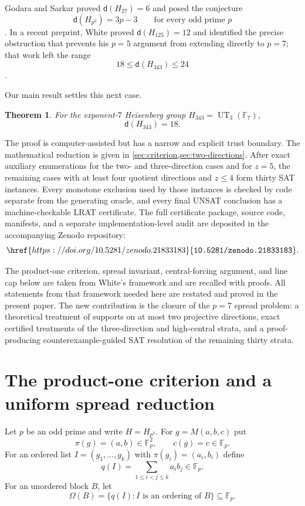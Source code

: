 \documentclass[11pt]{amsart}
\newtheorem{theorem}{Theorem}[section]
\theoremstyle{definition}
\newcommand{\F}{\mathbb F}
\newcommand{\HH}{H_{343}}
\newcommand{\dd}{\mathsf d}
\newcommand{\Om}{\Omega}
\begin{document}
Godara and Sarkar proved $\dd(H_{27})=6$ and posed the conjecture
\[
\dd(H_{p^3})=3p-3
\qquad\text{for every odd prime }p
\]
\cite{GodaraSarkar2025}. In a recent preprint, White proved
$\dd(H_{125})=12$ and identified the precise obstruction that prevents
his $p=5$ argument from extending directly to $p=7$; that work left the
range
\[
18\leq \dd(H_{343})\leq 24
\]
\cite{White2026}.

Our main result settles this next case.

\begin{theorem}\label{thm:main}
For the exponent-$7$ Heisenberg group $\HH=\operatorname{UT}_3(\F_7)$,
\[
\dd(\HH)=18.
\]
\end{theorem}

The proof is computer-assisted but has a narrow and explicit trust boundary. The mathematical reduction is given in \cref{sec:criterion,sec:two-directions}. After exact auxiliary enumerations for the two- and three-direction cases and for $z=5$, the remaining cases with at least four quotient directions and $z\leq4$ form thirty SAT instances. Every monotone exclusion used by those instances is checked by code separate from the generating oracle, and every final UNSAT conclusion has a machine-checkable LRAT certificate. The full certificate package, source code, manifests, and a separate implementation-level audit are deposited in the accompanying Zenodo repository:
\[
\href{https://doi.org/10.5281/zenodo.21833183}{\texttt{10.5281/zenodo.21833183}}.
\]

The product-one criterion, spread invariant, central-forcing argument,
and line cap below are taken from White's framework \cite{White2026}
and are recalled with proofs.  All statements from that framework
needed here are restated and proved in the present paper.  The new
contribution is the closure of the $p=7$ spread problem: a theoretical
treatment of supports on at most two projective directions, exact
certified treatments of the three-direction and high-central strata,
and a proof-producing counterexample-guided SAT resolution of the
remaining thirty strata.

\section{The product-one criterion and a uniform spread reduction}\label{sec:criterion}

Let $p$ be an odd prime and write $H=H_{p^3}$.  For
$g=M(a,b,c)$ put
\[
\pi(g)=(a,b)\in\F_p^2,\qquad c(g)=c\in\F_p.
\]
For an ordered list $I=(g_1,\ldots,g_k)$ with
$\pi(g_i)=(a_i,b_i)$ define
\[
q(I)=\sum_{1\leq i<j\leq k} a_i b_j\in\F_p.
\]
For an unordered block $B$, let
\[
\Om(B)=\{q(I): I\text{ is an ordering of }B\}\subseteq\F_p.
\]
\end{document}
